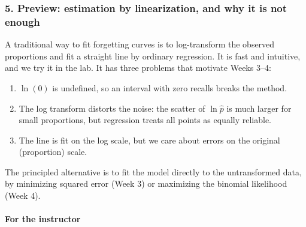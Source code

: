 \subsubsection{5. Preview: estimation by linearization, and why it is
not enough}

A traditional way to fit forgetting curves is to log-transform the
observed proportions and fit a straight line by ordinary regression. It
is fast and intuitive, and we try it in the lab. It has three problems
that motivate Weeks 3--4:

\begin{enumerate}
\def\labelenumi{\arabic{enumi}.}
\tightlist
\item
  \(\ln(0)\) is undefined, so an interval with zero recalls breaks the
  method.
\item
  The log transform distorts the noise: the scatter of \(\ln \hat p\) is
  much larger for small proportions, but regression treats all points as
  equally reliable.
\item
  The line is fit on the log scale, but we care about errors on the
  original (proportion) scale.
\end{enumerate}

The principled alternative is to fit the model directly to the
untransformed data, by minimizing squared error (Week 3) or maximizing
the binomial likelihood (Week 4).

\paragraph{For the instructor}

